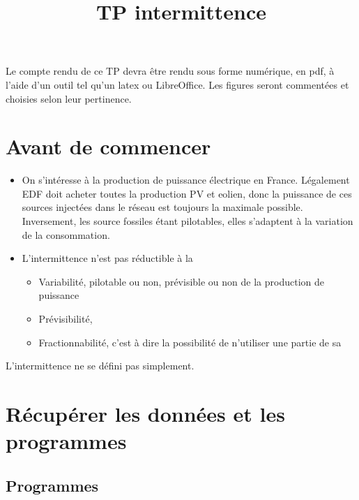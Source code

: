 \documentclass{article}
\begin{document}
\title{TP intermittence}

\maketitle

Le compte rendu de ce TP devra être rendu sous forme numérique, en pdf, à
l'aide d'un outil tel qu'un latex ou LibreOffice. Les figures seront
commentées et choisies selon leur pertinence.

\section{Avant de commencer}

\begin{itemize}
  \item On s'intéresse à la production de puissance électrique en France.
  Légalement EDF doit acheter toutes la production PV et eolien, donc la
  puissance de ces sources injectées dans le réseau est toujours la maximale
  possible. Inversement, les source fossiles étant pilotables, elles
  s'adaptent à la variation de la consommation.
  
  \item L'intermittence n'est pas réductible à la
  \begin{itemize}
    \item Variabilité, pilotable ou non, prévisible ou non de la production
    de puissance
    
    \item Prévisibilité,
    
    \item Fractionnabilité, c'est à dire la possibilité de n'utiliser une
    partie de sa 
  \end{itemize}
\end{itemize}
L'intermittence ne se défini pas simplement.

\section{Récupérer les données et les programmes}

\subsection{Programmes}
\end{document}
